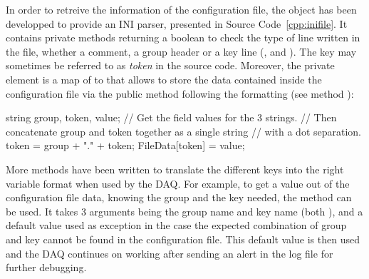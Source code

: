 	In order to retreive the information of the configuration file, the object  has been developped to provide an INI parser, presented in Source Code~\ref{cpp:inifile}. It contains private methods returning a boolean to check the type of line written in the file, whether a comment, a group header or a key line (,  and ). The key may sometimes be referred to as \textit{token} in the source code. Moreover, the private element  is a map of  to  that allows to store the data contained inside the configuration file via the public method  following the formatting (see method ):\\
	
	\begin{cppcode}
 string group, token, value;
 // Get the field values for the 3 strings.
 // Then concatenate group and token together as a single string
 // with a dot separation.
 token = group + "." + token;
 FileData[token] = value;
	\end{cppcode}
	\vspace{5mm}
	
	More methods have been written to translate the different keys into the right variable format when used by the DAQ. For example, to get a  value out of the configuration file data, knowing the group and the key needed, the method  can be used. It takes 3 arguments being the group name and key name (both ), and a default  value used as exception in the case the expected combination of group and key cannot be found in the configuration file. This default value is then used and the DAQ continues on working after sending an alert in the log file for further debugging.\\
	
